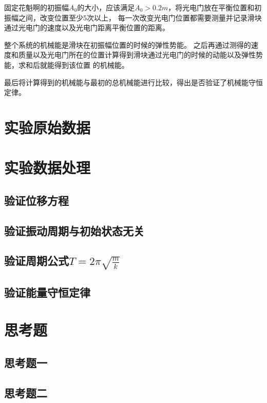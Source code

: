 \documentclass{ctexart}
\begin{document}
  固定花魁啊的初振幅$A_{0}$的大小，应该满足$A_{0}>0.2m$，将光电门放在平衡位置和初振幅之间，改变位置至少5次以上，
  每一次改变光电门位置都需要测量并记录滑块通过光电门的速度以及光电门距离平衡位置的距离。

  整个系统的机械能是滑块在初振幅位置的时候的弹性势能。
  之后再通过测得的速度和质量以及光电门所在的位置计算得到滑块通过光电门的时候的动能以及弹性势能，求和后就能得到该位置
  的机械能。

  最后将计算得到的机械能与最初的总机械能进行比较，得出是否验证了机械能守恒定律。

\section{实验原始数据}

\section{实验数据处理}
  \subsection{验证位移方程}
  \subsection{验证振动周期与初始状态无关}
  \subsection{验证周期公式$T=2\pi \sqrt{\frac{m}{k}}$}
  \subsection{验证能量守恒定律}

\section{思考题}
  \subsection{思考题一}
  \subsection{思考题二}
\end{document}
